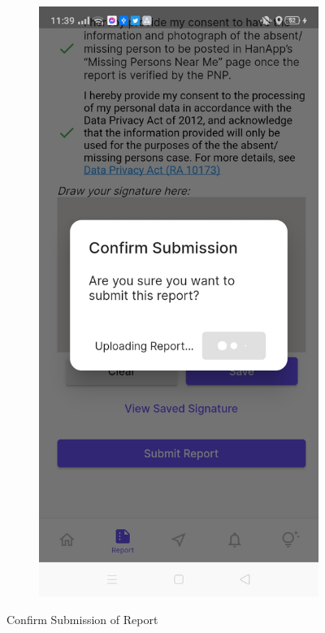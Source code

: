 \begin{figure}[!h]
\begin{subfigure}[c]{0.40\linewidth}
    \end{subfigure}
    \centering
    \begin{subfigure}[c]{0.40\linewidth}
        \centering
        \includegraphics[scale=0.15]{figures/Chapter4/Main/SubmitReport-2.jpg}
    \end{subfigure}
    \caption{Confirm Submission of Report}
    \label{fig:submitReport}
\end{figure}
%


